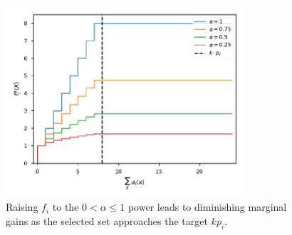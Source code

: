 \documentclass[12pt]{article}
\begin{document}
\clearpage

\begin{figure}
\begin{center}
\includegraphics[width=3.5in]{concave}
\caption{Raising $f_i$ to the $0 < \alpha \leq 1$ power leads to diminishing marginal gains as the selected set approaches the target $kp_i$.}\label{fig:concave}
\end{center}
\end{figure}

\clearpage
\end{document}
